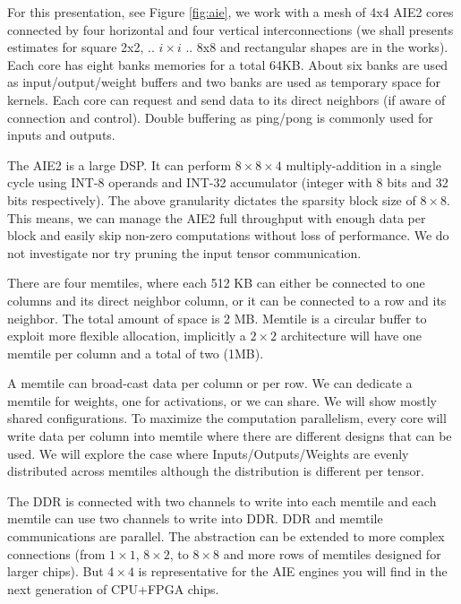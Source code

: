 \documentclass[conference]{IEEEtran}
\begin{document}
For this presentation, see Figure \ref{fig:aie}, we work with a mesh
of 4x4 AIE2 cores connected by four horizontal and four vertical
interconnections (we shall presents estimates for square 2x2,
.. $i\times i$ .. 8x8 and rectangular shapes are in the works). Each
core has eight banks memories for a total 64KB. About six banks are
used as input/output/weight buffers and two banks are used as
temporary space for kernels. Each core can request and send data to
its direct neighbors (if aware of connection and control). Double
buffering as ping/pong is commonly used for inputs and outputs.

The AIE2 is a large DSP. It can perform $8\times 8\times 4$
multiply-addition in a single cycle using INT-8 operands and INT-32
accumulator (integer with 8 bits and 32 bits respectively). The above
granularity dictates the sparsity block size of $8 \times 8$. This
means, we can manage the AIE2 full throughput with enough data per
block and easily skip non-zero computations without loss of
performance. We do not investigate nor try pruning the input tensor
communication. 



There are four memtiles, where each 512 KB can either be connected to
one columns and its direct neighbor column, or it can be connected to
a row and its neighbor. The total amount of space is 2 MB. Memtile is a
circular buffer to exploit more flexible allocation, implicitly a $2
\times 2$ architecture will have one memtile per column and a total of
two (1MB).

A memtile can broad-cast data per column or per row. We can dedicate a
memtile for weights, one for activations, or we can share. We will
show mostly shared configurations. To maximize the computation
parallelism, every core will write data per column into memtile where
there are different designs that can be used. We will explore the case
where Inputs/Outputs/Weights are evenly distributed across memtiles
although the distribution is different per tensor.

The DDR is connected with two channels to write into each memtile and
each memtile can use two channels to write into DDR. DDR and memtile
communications are parallel.  The abstraction can be extended to more
complex connections (from $1\times 1$, $8\times 2$, to $8\times 8$ and
more rows of memtiles designed for larger chips). But $4\times 4$ is
representative for the AIE engines you will find in the next
generation of CPU+FPGA chips.
\end{document}
